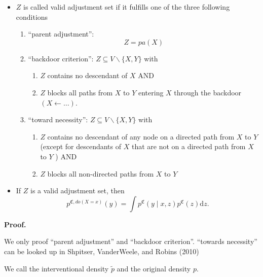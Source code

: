 \documentclass[
]{book}
\providecommand{\tightlist}{%
  \setlength{\itemsep}{0pt}\setlength{\parskip}{0pt}}
\begin{document}
\begin{itemize}
\item
  \(Z\) is called valid adjustment set if it fulfills one of the three following conditions

  \begin{enumerate}
  \def\labelenumi{\arabic{enumi}.}
  \tightlist
  \item
    ``parent adjustment'':
    \[
      {Z}=pa(X)
      \]
  \item
    ``backdoor criterion'': \({Z} \subseteq {V} \backslash\{X, Y\}\) with

    \begin{enumerate}
    \def\labelenumii{(\roman{enumii})}
    \tightlist
    \item
      \({Z}\) contains no descendant of \(X\) AND
    \item
      \({Z}\) blocks all paths from \(X\) to \(Y\) entering \(X\) through the backdoor \((X \leftarrow \ldots)\).
    \end{enumerate}
  \item
    ``toward necessity'': \({Z} \subseteq {V} \backslash\{X, Y\}\) with

    \begin{enumerate}
    \def\labelenumii{(\roman{enumii})}
    \tightlist
    \item
      \({Z}\) contains no descendant of any node on a directed path from \(X\) to \(Y\) (except for descendants of \(X\) that are not on a directed path from \(X\) to \(Y\) ) AND
    \item
      \({Z}\) blocks all non-directed paths from \(X\) to \(Y\)
    \end{enumerate}
  \end{enumerate}
\item
  If \(Z\) is a valid adjustment set, then
  \[
    p^{\mathfrak{C}, d o(X=x)}(y)=\int  p^{\mathfrak{C}}(y \mid x, {z}) p^{\mathfrak{C}}({z}) \mathrm dz.
    \]
\end{itemize}

\textbf{Proof.}

We only proof ``parent adjustment'' and ``backdoor criterion''. ``towards necessity'' can be looked up in Shpitser, VanderWeele, and Robins (2010)

We call the interventional density \(\tilde p\) and the original density \(p\).
\end{document}
